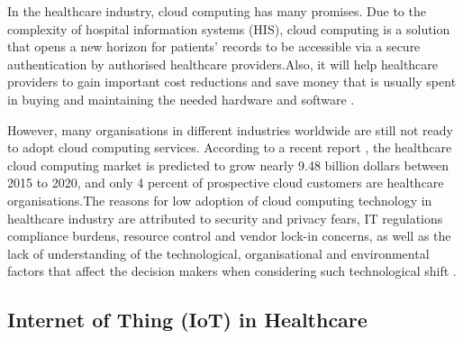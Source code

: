 In the healthcare industry, cloud computing has many promises. Due to the complexity of hospital information systems (HIS), cloud computing is a solution that opens a new horizon for patients’ records to be accessible via a secure authentication by authorised healthcare providers\cite{Grindle2013}.Also, it will help healthcare providers to gain important cost reductions and save money that is usually spent in buying and maintaining the needed hardware and software \cite{ahuja2012survey,Masrom2014}.

However, many organisations in different industries worldwide are still not ready to adopt cloud computing services. According to a recent report \cite{MarketsandMarkets}, the healthcare cloud computing market is predicted to grow nearly 9.48 billion dollars between 2015 to 2020, and only 4 percent of prospective cloud customers are healthcare organisations.The reasons for low adoption of cloud computing technology in healthcare industry are attributed to security and privacy fears, IT regulations compliance burdens, resource control and vendor lock-in concerns, as well as the lack of understanding of the technological, organisational and environmental factors that affect the decision makers when considering such technological shift \cite{MarketsandMarkets,tweel2012examining}.




\subsection{Internet of Thing (IoT) in Healthcare}


